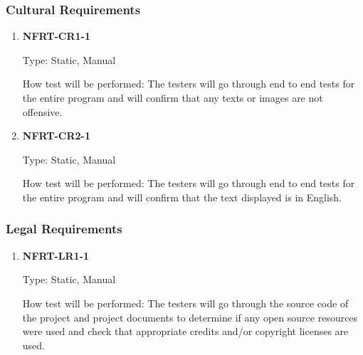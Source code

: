\documentclass[12pt, titlepage]{article}
\begin{document}
\subsubsection{Cultural Requirements}
\begin{enumerate}
	\item \textbf{NFRT-CR1-1}

	      Type: Static, Manual

	      How test will be performed: The testers will go through end to end tests for the entire program and
	      will confirm that any texts or images are not offensive.

	\item \textbf{NFRT-CR2-1}

	      Type: Static, Manual

	      How test will be performed: The testers will go through end to end tests for the entire program and
	      will confirm that the text displayed is in English.

\end{enumerate}

\subsubsection{Legal Requirements}
\begin{enumerate}
	\item \textbf{NFRT-LR1-1}

	      Type: Static, Manual

	      How test will be performed: The testers will go through the source code of the project and project
	      documents to determine if any open source resources were used and check that appropriate credits
	      and/or copyright licenses are used.

\end{enumerate}
\end{document}

